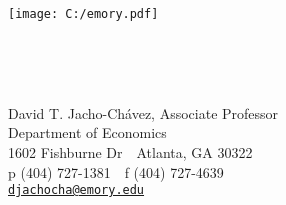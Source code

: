 \documentclass[12pt]{article}
\newcommand{\email}[1]{\href{mailto:#1}{\tt \textcolor{cornflower}{#1}}}
\begin{document}
\hspace{-1.5cm}
\begin{minipage}[c]{8in}\vskip-2cm
\begin{flushleft}
	\begin{minipage}[c]{6cm}
		\begin{flushleft}
			\texttt{[image: C:/emory.pdf]}%
		\end{flushleft}
	\end{minipage}
	\,\,
	\begin{minipage}[c]{0.25cm}
		\vrule depth 0.1\textheight
	\end{minipage}
	\,
	\begin{minipage}[c]{8cm}
		\footnotesize
		{\sffamily
			David T. Jacho-Ch\'{a}vez, Associate Professor\\
			Department of Economics \\
			1602 Fishburne Dr \,\vrule depth 0.25em \, Atlanta, GA 30322 \\
			p (404) 727-1381 \,\vrule depth 0.25em \, f (404) 727-4639 \\
			\email{djachocha@emory.edu}
		}
	\end{minipage}
\end{flushleft}
\end{minipage}
\end{document}
